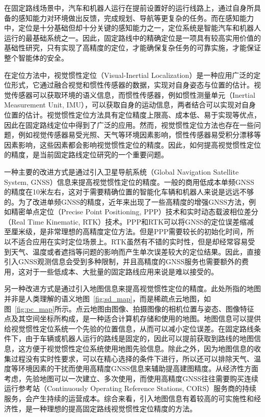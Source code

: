 在固定路线场景中，汽车和机器人运行在提前设置好的运行线路上，通过自身所具备的感知能力对环境做出反馈，完成规划、导航等更复杂的任务。而在感知能力中，定位是十分基础但却十分关键的感知能力之一，定位系统是智能汽车和机器人运行的最基础系统之一。因此，固定路线中的精确定位是一项具有较高实用价值的基础性研究，只有实现了高精度的定位，才能确保复杂任务的可靠实施，才能保证整个智能体的安全。

在定位方法中，视觉惯性定位（Visual-Inertial Localization）是一种应用广泛的定位形式，它通过融合视觉和惯性传感器的数据，实现对自身姿态与位置的估计。视觉传感器可以获取环境的语义信息，而惯性传感器，例如惯性测量单元（Inertial Measurement Unit, IMU），可以获取自身的运动信息，两者结合可以实现对自身位置的估计。视觉惯性定位方法具有定位精度上限高、成本低、易于实现等优点，因此在固定路线定位中得到了广泛的应用。然而，视觉惯性定位方法也存在一些问题，例如视觉传感器易受光照、天气等环境因素影响，惯性传感器易受积分漂移等因素影响，这些因素都会影响视觉惯性定位的精度。因此，如何提高视觉惯性定位的精度，是当前固定路线定位研究的一个重要问题。

一种主要的改进方式是通过引入卫星导航系统（Global Navigation Satellite System, GNSS）信息来提高视觉惯性定位的精度。一般的商用低成本单频GNSS的精度在10米左右，这对于需要精确位置的智能化车辆和机器人来说是远远不够的。为了改进单频GNSS的精度，近年来出现了一些高精度的增强GNSS方法，例如精密单点定位（Precise Point Positioning, PPP）\cite{赵琳2021多系统混频非差非组合精密单点定位方法研究}技术和实时动态载波相位差分（Real Time Kinematic, RTK）\cite{dardanelli2021nrtk}技术。PPP和RTK可以将GNSS的定位误差缩减至厘米级，是非常理想的高精度定位方法。但是PPP需要较长的初始化时间\cite{du2021vulnerabilities}，所以不适合应用在实时定位场景上。RTK虽然有不错的实时性，但是却经常容易受到天气、温度或者遮挡等问题的影响而产生单次误差较大的定位结果\cite{li2022review}。因此，直接引入GNSS观测信息会受到多种限制，并且高精度的GNSS服务也需要额外的费用，这对于一些低成本、大批量的固定路线应用来说是难以接受的。

另一种改进方式是通过引入地图信息来提高视觉惯性定位的精度。此处所指的地图并非是人类理解的语义地图~\ref{fig:sd_map}，而是稀疏点云地图，如图~\ref{fig:pc_map}所示。点云地图由图像、拍摄图像的相机位置与姿态、图像特征点及其空间坐标所构成，是一种适合计算机存储和使用的地图。地图信息可以提供给视觉惯性定位系统一个先验的位置信息，从而可以减小定位误差。在固定路线条件下，由于车辆或机器人运行的路线是固定的，因此可以提前获取到路线的地图信息，这方便于视觉惯性定位系统使用地图先验信息。除此之外，因为地图信息的收集过程没有实时性要求，可以在精心选择的条件下进行，所以还可以排除天气、温度等环境因素的干扰而使用高精度GNSS信息来辅助提高建图精度。从经济性方面考虑，先验地图可以一次建立、多次使用，而使用高精度GNSS往往需要购买连续运行参考站（Continuously Operating Reference Stations, CORS）服务商的持续服务\cite{WTZB202201018,XDDH202401014}，会产生持续的运营成本。综合来看，引入地图信息有着较高的可实施性和经济性，是一种理想的提高固定路线视觉惯性定位精度的方法。

